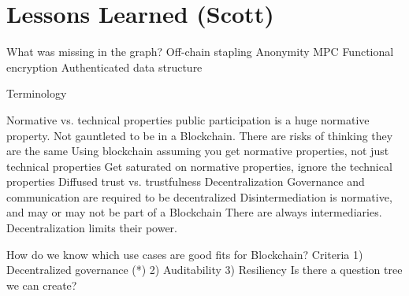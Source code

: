 \section{Lessons Learned (Scott)}

What was missing in the graph?
	Off-chain stapling
	Anonymity
		MPC
		Functional encryption
	Authenticated data structure

Terminology

Normative vs. technical properties
	public participation is a huge normative property. Not gauntleted to be in a Blockchain.
	There are risks of thinking they are the same
		Using blockchain assuming you get normative properties, not just technical properties
		Get saturated on normative properties, ignore the technical properties
	Diffused trust vs. trustfulness
	Decentralization
		Governance and communication are required to be decentralized
		Disintermediation is normative, and may or may not be part of a Blockchain
			There are always intermediaries. Decentralization limits their power.



How do we know which use cases are good fits for Blockchain?
Criteria
	1) Decentralized governance (*)
	2) Auditability
	3) Resiliency	
Is there a question tree we can create?